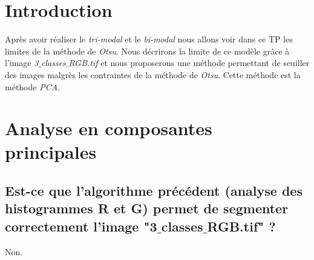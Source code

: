 \documentclass[a4paper,12pt]{report}
\begin{document}


\setcounter{page}{1} 
\newpage

\section*{Introduction}

Après avoir réaliser le \textit{tri-modal} et le \textit{bi-modal} nous allons voir dans ce TP les limites de la méthode de \textit{Otsu}. Nous décrirons la limite de ce modèle grâce à l'image \textit{3$\_$classes$\_$RGB.tif} et nous proposerons une méthode permettant de seuiller des images malgrès les contraintes de la méthode de \textit{Otsu}. Cette méthode est la méthode \textit{PCA}.

\section*{Analyse en composantes principales}

\subsection*{Est-ce que l'algorithme précédent (analyse des histogrammes R et G) permet de segmenter correctement l'image "3$\_$classes$\_$RGB.tif" ? }

Non. 
\end{document}
